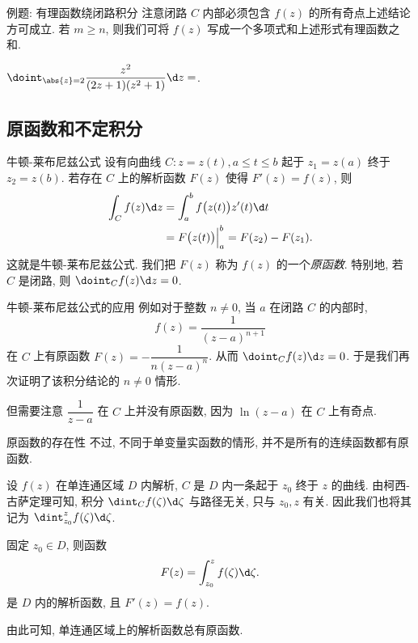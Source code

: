 \begin{frame}{例题: 有理函数绕闭路积分}
	\onslide<+->
	注意闭路 $C$ 内部必须包含 $f(z)$ 的所有奇点上述结论方可成立.
	\onslide<+->
	若 $m\ge n$, 则我们可将 $f(z)$ 写成一个多项式和上述形式有理函数之和.
	\onslide<+->
	\begin{exercise}
		$\doint_{\abs{z}=2}\dfrac{z^2}{(2z+1)(z^2+1)}\d z=$\fillblankframe{$\pi\ii$}.
	\end{exercise}
\end{frame}


\subsection{原函数和不定积分}


\begin{frame}{牛顿-莱布尼兹公式}
	\onslide<+->
	设有向曲线 $C:z=z(t),a\le t\le b$ 起于 $z_1=z(a)$ 终于 $z_2=z(b)$.
	\onslide<+->
	若存在 $C$ 上的解析函数 $F(z)$ 使得 $F'(z)=f(z)$, 则
	\begin{align*}
			\int_C f(z)\d z&
		=\int_a^b f\bigl(z(t)\bigr)z'(t)\d t\\&
		=F\bigl(z(t)\bigr)\Big|_a^b
		=F(z_2)-F(z_1).
	\end{align*}
	\onslide<+->
	这就是\alert{牛顿-莱布尼兹公式}.
	\onslide<+->
	我们把 $F(z)$ 称为 $f(z)$ 的一个\emph{原函数}.
	\onslide<+->
	特别地, 若 $C$ 是闭路, 则 $\doint_C f(z)\d z=0$.
\end{frame}


\begin{frame}{牛顿-莱布尼兹公式的应用}
	\onslide<+->
	例如对于整数 $n\neq0$, 当 $a$ 在闭路 $C$ 的内部时,
	\[
		f(z)=\dfrac1{(z-a)^{n+1}}
	\]
	在 $C$ 上有原函数 $F(z)=-\dfrac1{n(z-a)^n}$.
	\onslide<+->
	从而 $\doint_C f(z)\d z=0$. 
	\onslide<+->
	于是我们再次证明了该积分结论的 $n\neq0$ 情形.

	\onslide<+->
	但需要注意 $\dfrac1{z-a}$ 在 $C$ 上并没有原函数, 因为 $\ln(z-a)$ 在 $C$ 上有奇点.
\end{frame}


\begin{frame}{原函数的存在性}
	\onslide<+->
	不过, 不同于单变量实函数的情形, 并不是所有的连续函数都有原函数.

	\onslide<+->
	设 $f(z)$ 在单连通区域 $D$ 内解析, $C$ 是 $D$ 内一条起于 $z_0$ 终于 $z$ 的曲线.
	\onslide<+->
	由柯西-古萨定理可知, 积分 $\dint_Cf(\zeta)\d \zeta$ 与路径无关, 只与 $z_0,z$ 有关.
	\onslide<+->
	因此我们也将其记为 $\dint_{z_0}^zf(\zeta)\d\zeta$.
	\onslide<+->
	\begin{theorem}
		固定 $z_0\in D$, 则函数
		\[
			F(z)=\int_{z_0}^zf(\zeta)\d\zeta.
		\]
		是 $D$ 内的解析函数, 且 $F'(z)=f(z)$.
	\end{theorem}
	\onslide<+->
	由此可知, \alert{单连通区域上的解析函数总有原函数}.
\end{frame}


